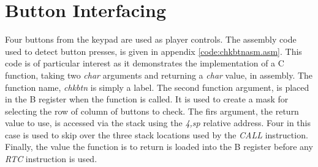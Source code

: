 \section{Button Interfacing} 

Four buttons from the keypad are used as player controls.
The assembly code used to detect button presses, is given in appendix \ref{code:chkbtnasm.asm}.
This code is of particular interest as it demonstrates the implementation of a C function, taking two \emph{char} arguments and returning a \emph{char} value, in assembly.
The function name, \emph{chkbtn} is simply a label.
The second function argument, is placed in the B register when the function is called.
It is used to create a mask for selecting the row of column of buttons to check.
The firs argument, the return value to use, is accessed via the stack using the \emph{4,sp} relative address.
Four in this case is used to skip over the three stack locations used by the \emph{CALL} instruction.
Finally, the value the function is to return is loaded into the B register before any \emph{RTC} instruction is used.